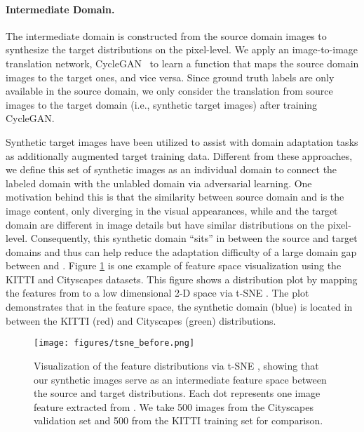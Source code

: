 \documentclass[10pt,twocolumn,letterpaper]{article}
\begin{document}
\vspace{-2mm}\paragraph{Intermediate Domain.}
The intermediate domain is constructed from the source domain images to synthesize the target distributions on the pixel-level.
We apply an image-to-image translation network, CycleGAN~\cite{CycleGAN2017} to learn a function that maps the source domain images to the target ones, and vice versa.
Since ground truth labels are only available in the source domain, we only consider the translation from source images to the target domain (i.e., synthetic target images) after training CycleGAN.

Synthetic target images have been utilized to assist with domain adaptation tasks \cite{bousmalis2017unsupervised, huang2018auggan, Inoue_2018_CVPR} as additionally augmented target training data.
Different from these approaches, we define this set of synthetic images as an individual domain  to connect the labeled domain  with the unlabled domain  via adversarial learning.
One motivation behind this is that the similarity between source domain  and  is the image content, only diverging in the visual appearances, while  and the target domain  are different in image details but have similar distributions on the pixel-level.
Consequently, this synthetic domain ``sits'' in between the source and target domains and thus can help reduce the adaptation difficulty of a large domain gap between  and .
Figure \ref{fig:tsne_before} is one example of feature space visualization using the KITTI and Cityscapes datasets.
This figure shows a distribution plot by mapping the features from  to a low dimensional 2-D space via t-SNE \cite{vanDerMaaten2008}.
The plot demonstrates that in the feature space, the synthetic domain  (blue) is located in between the KITTI (red) and Cityscapes (green) distributions.
\begin{figure}
		\begin{center}
        \texttt{[image: figures/tsne\_before.png]}
		\end{center}
		\caption{
        Visualization of the feature distributions via t-SNE \cite{vanDerMaaten2008}, showing that our synthetic images serve as an intermediate feature space between the source and target distributions.
Each dot represents one image feature extracted from .
We take 500 images from the Cityscapes validation set and 500 from the KITTI training set for comparison.
}
		\label{fig:tsne_before}
\vspace{-3mm}
\end{figure}
\end{document}
